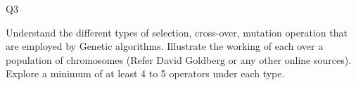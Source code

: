 \documentclass[12pt]{article}
\renewcommand{\_}{\kern-1.5pt\textunderscore\kern-1.5pt}
\begin{document}

\par


\vspace{\baselineskip}
\setlength{\parskip}{8.04pt}

\vspace{\baselineskip}

\vspace{\baselineskip}

\vspace{\baselineskip}

\vspace{\baselineskip}

\vspace{\baselineskip}

\vspace{\baselineskip}

\vspace{\baselineskip}

\vspace{\baselineskip}

\vspace{\baselineskip}

\vspace{\baselineskip}

\vspace{\baselineskip}
\begin{Center}
{\fontsize{28pt}{33.6pt}\selectfont Q3\par}
\end{Center}\par

{\fontsize{14pt}{16.8pt}\selectfont Understand the different types of selection, cross-over, mutation operation that are employed by Genetic algorithms. Illustrate the working of each over a population of chromosomes (Refer David Goldberg or any other online sources). Explore a minimum of at least 4 to 5 operators under each type.\par}\par
\end{document}
